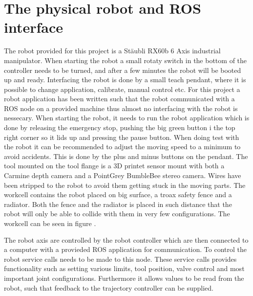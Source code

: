

\section{The physical robot and ROS interface}
\label{sec:robot_physical}
The robot provided for this project is a Stäubli RX60b 6 Axis industrial manipulator. When starting the robot a small rotaty switch in the bottom of the controller needs to be turned, and after a few minutes the robot will be booted up and ready. Interfacing the robot is done by a small teach pendant, where it is possible to change application, calibrate, manual control etc. For this project a robot application has been written such that the robot communicated with a ROS node on a provided machine thus almost no interfacing with the robot is nessecary. When starting the robot, it needs to run the robot application which is done by releasing the emergency stop, pushing the big green button i the top right corner so it lids up and pressing the pause button. When doing test with the robot it can be recommended to adjust the moving speed to a minimum to avoid accidents. This is done by the plus and minus buttons on the pendant.
The tool mounted on the tool flange is a 3D printet sensor mount with both a Carmine depth camera and a PointGrey BumbleBee stereo camera. Wires have been stripped to the robot to avoid them getting stuck in the moving parts. 
The workcell contains the robot placed on big surface, a troax safety fence and a radiator. Both the fence and the radiator is placed in such distance that the robot will only be able to collide with them in very few configurations. The workcell can be seen in figure .


The robot axis are controlled by the robot controller which are then connected to a computer with a provieded ROS application for communication. To control the robot service calls needs to be made to this node. These service calls provides functionality such as setting various limits, tool position, valve control and most important joint configurations. Furthermore it allows values to be read from the robot, such that feedback to the trajectory controller can be supplied.


